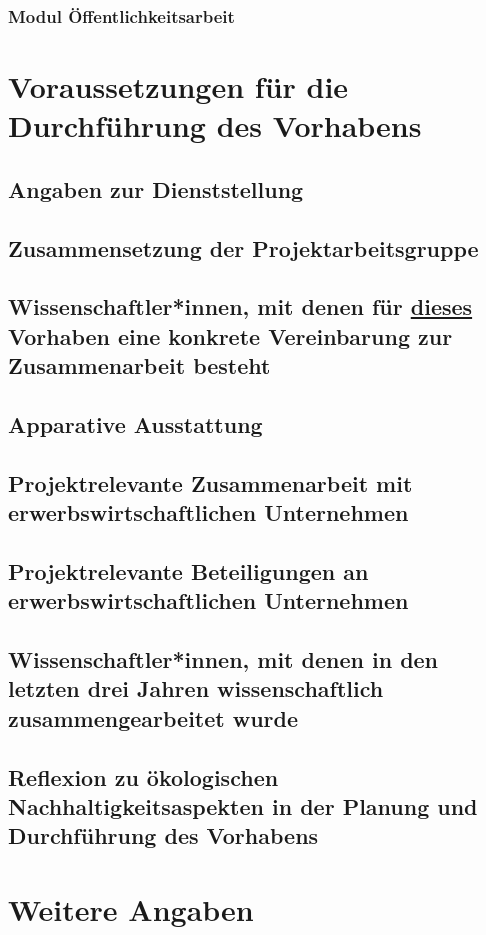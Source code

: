 \documentclass[german, 53.02]{proposal}
\begin{document}
\subsubsection{Modul Öffentlichkeitsarbeit}


\section{Voraussetzungen für die Durchführung des Vorhabens}

\subsection{Angaben zur Dienststellung}

\subsection{Zusammensetzung der Projektarbeitsgruppe}

\subsection{Wissenschaftler*innen, mit denen für \underline{dieses} Vorhaben eine konkrete Vereinbarung zur Zusammenarbeit besteht}

\subsection{Apparative Ausstattung}

\subsection{Projektrelevante Zusammenarbeit mit erwerbswirtschaftlichen Unternehmen}

\subsection{Projektrelevante Beteiligungen an erwerbswirtschaftlichen Unternehmen}

\subsection{Wissenschaftler*innen, mit denen in den letzten drei Jahren wissenschaftlich zusammengearbeitet wurde}

\subsection{Reflexion zu ökologischen Nachhaltigkeitsaspekten in der Planung und Durchführung des Vorhabens}


\section{Weitere Angaben}
\end{document}
